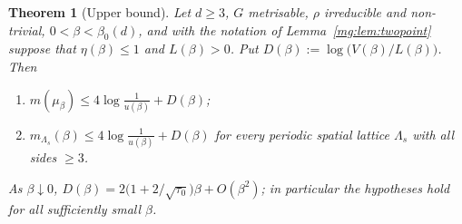 \documentclass[11pt,a4paper]{article}
\newtheorem{theorem}{Theorem}[section]
\theoremstyle{definition}
\theoremstyle{remark}
\begin{document}
\begin{theorem}[Upper bound]\label{mg:thm:upper}
Let $d\ge3$, $G$ metrisable, $\rho$ irreducible and non-trivial, $0<\beta<\beta_0(d)$, and with the notation of Lemma~\ref{mg:lem:twopoint}
suppose that $\eta(\beta)\le1$ and $L(\beta)>0$. Put $D(\beta):=\log\bigl(V(\beta)/L(\beta)\bigr)$. Then
\begin{enumerate}[label=(\roman*)]
\item $m(\mu_\beta)\le4\log\frac1{u(\beta)}+D(\beta)$;
\item $m_{\Lambda_s}(\beta)\le4\log\frac1{u(\beta)}+D(\beta)$ for every periodic spatial lattice $\Lambda_s$ with all sides $\ge3$.
\end{enumerate}
As $\beta\downarrow0$, $D(\beta)=2\bigl(1+2/\sqrt{\tau_0}\bigr)\beta+O(\beta^2)$; in particular the hypotheses hold for all sufficiently small $\beta$.
\end{theorem}
\end{document}
